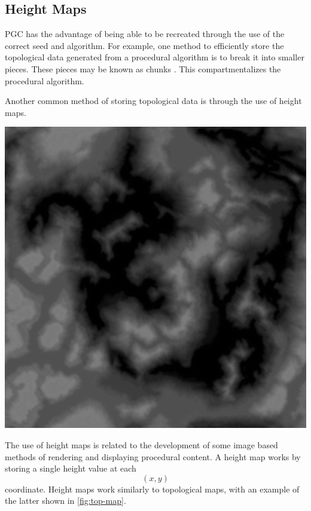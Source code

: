 \documentclass[10pt]{report}
\begin{document}
		\subsection{Height Maps}
			PGC has the advantage of being able to be recreated through the use of the correct seed and algorithm. For example, one method to efficiently store the topological data generated from a procedural algorithm is to break it into smaller pieces. These pieces may be known as chunks \cite{tiling}. This compartmentalizes the procedural algorithm.
			
			Another common method of storing topological data is through the use of height maps. 
			
			\begin{minipage}{\textwidth}
				\centering
				\includegraphics[scale=.5]{D10}
				\label{fig:height-map}
			\end{minipage}
			
			The use of height maps is related to the development of some image based methods of rendering and displaying procedural content. A height map works by storing a single height value at each \[(x,y)\] coordinate. Height maps work similarly to topological maps, with an example of the latter shown in \autoref{fig:top-map}.
			
\end{document}
